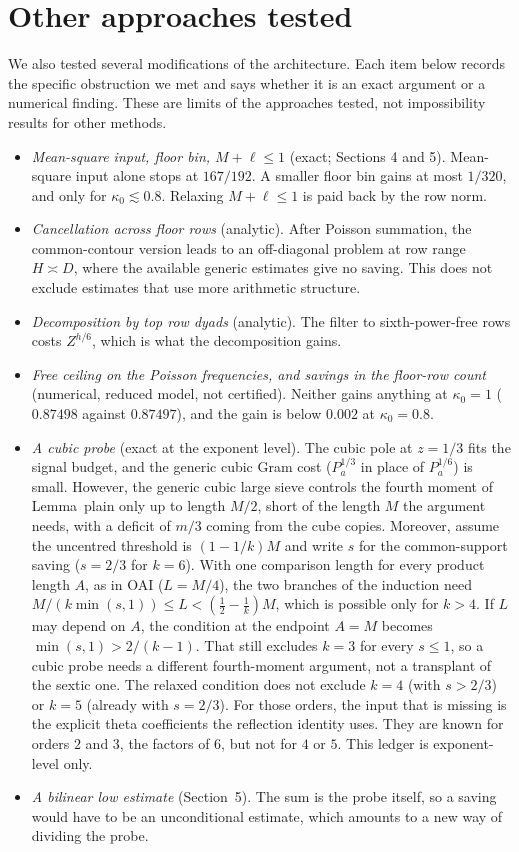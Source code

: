 \documentclass[11pt]{article}
\theoremstyle{remark}\newtheorem*{remark}{Remark}
\begin{document}
\section{Other approaches tested}
We also tested several modifications of the architecture. Each item below records the specific
obstruction we met and says whether it is an exact argument or a numerical finding. These are
limits of the approaches tested, not impossibility results for other methods.
\begin{itemize}
\item \emph{Mean-square input, floor bin, $M+\ell\le1$} (exact; Sections 4 and 5). Mean-square
input alone stops at $167/192$. A smaller floor bin gains at most $1/320$, and only for
$\kappa_0\lesssim0.8$. Relaxing $M+\ell\le1$ is paid back by the row norm.
\item \emph{Cancellation across floor rows} (analytic). After Poisson summation, the common-contour
version leads to an off-diagonal problem at row range $H\asymp D$, where the available generic
estimates give no saving. This does not exclude estimates that use more arithmetic structure.
\item \emph{Decomposition by top row dyads} (analytic). The filter to sixth-power-free rows
costs $Z^{h/6}$, which is what the decomposition gains.
\item \emph{Free ceiling on the Poisson frequencies, and savings in the floor-row count}
(numerical, reduced model, not certified). Neither gains anything at $\kappa_0=1$
($0.87498$ against $0.87497$), and the gain is below $0.002$ at $\kappa_0=0.8$.
\item \emph{A cubic probe} (exact at the exponent level). The cubic pole at $z=1/3$ fits the
signal budget, and the generic cubic Gram cost ($P_a^{1/3}$ in place of $P_a^{1/6}$) is small.
However, the generic cubic large sieve controls the fourth moment of Lemma~plain only up to
length $M/2$, short of the length $M$ the argument needs, with a deficit of $m/3$ coming from the
cube copies. Moreover, assume the uncentred threshold is $(1-1/k)M$ and write $s$ for the
common-support saving ($s=2/3$ for $k=6$). With one comparison length for every product length
$A$, as in OAI ($L=M/4$), the two branches of the induction need
$M/(k\min(s,1))\le L<(\frac12-\frac1k)M$, which is possible only for $k>4$. If $L$ may depend on $A$,
the condition at the endpoint $A=M$ becomes $\min(s,1)>2/(k-1)$. That still excludes $k=3$ for
every $s\le1$, so a cubic probe needs a different fourth-moment argument, not a transplant of the
sextic one. The relaxed condition does not exclude $k=4$ (with $s>2/3$) or $k=5$ (already with
$s=2/3$). For those orders, the input that is missing is the explicit theta coefficients the
reflection identity uses. They are known for orders $2$ and $3$, the factors of $6$, but not for
$4$ or $5$. This ledger is exponent-level only.
\item \emph{A bilinear low estimate} (Section~5). The sum is the probe itself, so a saving would
have to be an unconditional estimate, which amounts to a new way of dividing the probe.
\end{itemize}
\end{document}
